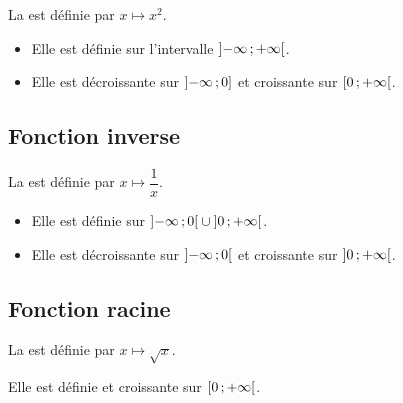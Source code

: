 \documentclass[12pt,a4paper]{article}
\begin{document}
	\begin{mydef}
		La  est définie par $x \mapsto x^2$.
	\end{mydef}
	
	\begin{myprops}
		\begin{itemize}
			\item Elle est définie sur l'intervalle $\mbox{\ensuremath{\left]- \infty \mathpunct{};+ \infty\right[}}$.
			\item Elle est décroissante sur $\mbox{\ensuremath{\left]- \infty\mathpunct{};0\right]}}$ et croissante sur $\mbox{\ensuremath{\left[0\mathpunct{};+ \infty\right[}}$.
		\end{itemize}
		
	\end{myprops}
	
	
	
	
	\subsection{Fonction inverse}
	
	\begin{mydef}
		La  est définie par $x \mapsto \dfrac{1}{x}$.			
	\end{mydef}
	
	\begin{myprops}
		\begin{itemize}
			\item Elle est définie sur $\mbox{\ensuremath{\left]-\infty\mathpunct{};0\right[}} \cup \mbox{\ensuremath{\left]0\mathpunct{};+\infty\right[}}$.
			\item Elle est décroissante sur $\mbox{\ensuremath{\left]- \infty\mathpunct{};0\right[}}$ et croissante sur $\mbox{\ensuremath{\left]0\mathpunct{};+ \infty\right[}}$. 
		\end{itemize}
	\end{myprops}
	
	
	\subsection{Fonction racine}
	
	\begin{mydef}
		La  est définie par $x \mapsto \sqrt{x}$.			
	\end{mydef}
	
	\begin{myprops}
		
		Elle est définie et croissante sur $\mbox{\ensuremath{\left[0\mathpunct{};+\infty\right[}}$.
			
		
	\end{myprops}
	
\end{document}
